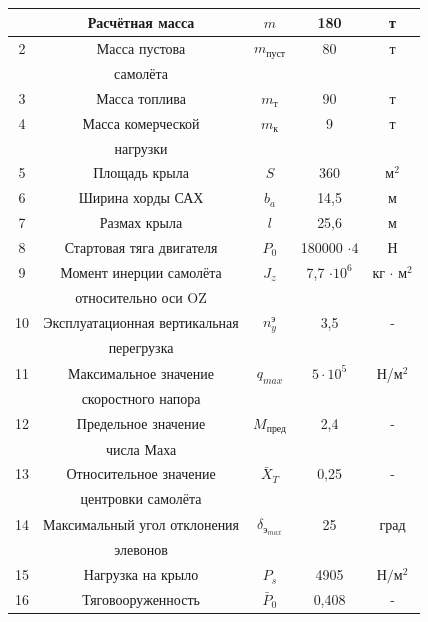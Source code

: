 \begin{longtable}[H]{|c|c|c|c|c|}
    \hline \hline
    \endlastfoot
         \hline
        1 & Расчётная масса & $m$ & 180 & т\\ \hline
        2 & Масса пустова & $m_\text{пуст}$ & 80 & т\\
         & самолёта &  &  & \\ \hline
        3 & Масса топлива & $m_\text{т}$ & 90 & т\\ \hline
        4 & Масса комерческой & $m_\text{к}$ & 9 & т \\
         & нагрузки & & & \\ \hline
        5 & Площадь крыла & $S$ & 360 & м$^2$\\ \hline
        6 & Ширина хорды САХ & $b_a$& 14,5 & м\\ \hline
        7 & Размах крыла & $l$ & 25,6 & м\\ \hline
        8 & Стартовая тяга двигателя & $P_0$ & 180000 $\cdot 4$ & Н\\ \hline
        9 & Момент инерции самолёта& $J_z$ & 7,7 $\cdot 10^{6}$ & кг $\cdot$ м$^2$ \\ 
         & относительно оси OZ &  &  & \\ \hline
        10 & Эксплуатационная вертикальная & $n_y^\text{э}$ & 3,5 & -\\ 
         & перегрузка &  &  & \\ \hline
        11 & Максимальное значение & $q_{max}$ & $5 \cdot 10^5$ & Н/м$^2$\\ 
         & скоростного напора &  &  & \\ \hline
        12 & Предельное значение & $M_\text{пред}$ & 2,4 & -\\ 
         & числа Маха &  &  & \\ \hline
        13 & Относительное значение & $\bar{X}_{T}$ & 0,25& -\\ 
         & центровки самолёта &  &  & \\ \hline
        14 & Максимальный угол отклонения & $\delta_{\text{э}_{max}}$ & 25 &град \\ 
        & элевонов & & & \\ \hline
        15 & Нагрузка на крыло & $P_s$ & 4905 & ${\text{Н}}/{\text{м}^2}$ \\ \hline
        16 & Тяговооруженность & $\bar{P}_0$ & 0,408 & - \\ \hline

\end{longtable}

